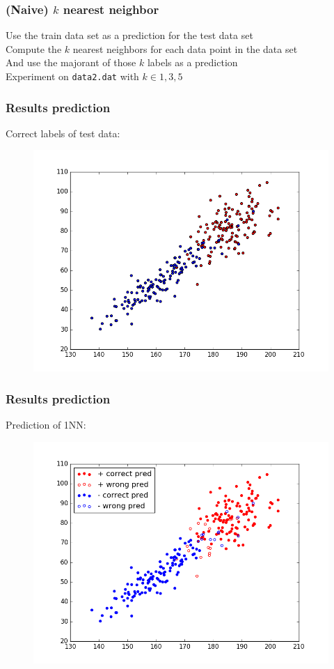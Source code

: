 \documentclass{beamer}
\begin{document}
\begin{frame}
	\frametitle{(Naive) $k$ nearest neighbor}
	Use the train data set as a prediction for the test data set \\\medskip
	Compute the $k$ nearest neighbors for each data point in the data set \\\medskip
	And use the majorant of those $k$ labels as a prediction \\\medskip
	Experiment on \texttt{data2.dat} with $k \in {1,3,5}$
\end{frame}

\begin{frame}
\frametitle{Results prediction}
	Correct labels of test data:
	\begin{figure}
	\includegraphics[height=0.8\textheight]{graphics/testWithCorrect}
	\end{figure}
\end{frame} 

\begin{frame}
\frametitle{Results prediction}
Prediction of 1NN:
\begin{figure}
	\includegraphics[height=0.8\textheight]{graphics/1NNPrediction}
\end{figure}
\end{frame} 
\end{document}
